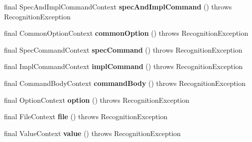\begin{DoxyCompactItemize}
\item 
\hypertarget{classedu_1_1udel_1_1cis_1_1vsl_1_1civl_1_1run_1_1common_1_1CommandParser_afbb20bc5e29cd4def9ef60e00644df9f}{}final Spec\+And\+Impl\+Command\+Context {\bfseries spec\+And\+Impl\+Command} ()  throws Recognition\+Exception \label{classedu_1_1udel_1_1cis_1_1vsl_1_1civl_1_1run_1_1common_1_1CommandParser_afbb20bc5e29cd4def9ef60e00644df9f}

\item 
\hypertarget{classedu_1_1udel_1_1cis_1_1vsl_1_1civl_1_1run_1_1common_1_1CommandParser_a45b151d7647ce098458e24858ea4d527}{}final Common\+Option\+Context {\bfseries common\+Option} ()  throws Recognition\+Exception \label{classedu_1_1udel_1_1cis_1_1vsl_1_1civl_1_1run_1_1common_1_1CommandParser_a45b151d7647ce098458e24858ea4d527}

\item 
\hypertarget{classedu_1_1udel_1_1cis_1_1vsl_1_1civl_1_1run_1_1common_1_1CommandParser_aa72f23edb71fb58248a8b8488e876258}{}final Spec\+Command\+Context {\bfseries spec\+Command} ()  throws Recognition\+Exception \label{classedu_1_1udel_1_1cis_1_1vsl_1_1civl_1_1run_1_1common_1_1CommandParser_aa72f23edb71fb58248a8b8488e876258}

\item 
\hypertarget{classedu_1_1udel_1_1cis_1_1vsl_1_1civl_1_1run_1_1common_1_1CommandParser_ac9efcc26c56a278c737f16b9a2f2233a}{}final Impl\+Command\+Context {\bfseries impl\+Command} ()  throws Recognition\+Exception \label{classedu_1_1udel_1_1cis_1_1vsl_1_1civl_1_1run_1_1common_1_1CommandParser_ac9efcc26c56a278c737f16b9a2f2233a}

\item 
\hypertarget{classedu_1_1udel_1_1cis_1_1vsl_1_1civl_1_1run_1_1common_1_1CommandParser_a22cebc9e35afa09b03e50c2395755ca7}{}final Command\+Body\+Context {\bfseries command\+Body} ()  throws Recognition\+Exception \label{classedu_1_1udel_1_1cis_1_1vsl_1_1civl_1_1run_1_1common_1_1CommandParser_a22cebc9e35afa09b03e50c2395755ca7}

\item 
\hypertarget{classedu_1_1udel_1_1cis_1_1vsl_1_1civl_1_1run_1_1common_1_1CommandParser_a2aa8faaa143d7ba25da59e84109fcc0b}{}final Option\+Context {\bfseries option} ()  throws Recognition\+Exception \label{classedu_1_1udel_1_1cis_1_1vsl_1_1civl_1_1run_1_1common_1_1CommandParser_a2aa8faaa143d7ba25da59e84109fcc0b}

\item 
\hypertarget{classedu_1_1udel_1_1cis_1_1vsl_1_1civl_1_1run_1_1common_1_1CommandParser_ab0a20bbf3c3fc93814fa322b03d731c6}{}final File\+Context {\bfseries file} ()  throws Recognition\+Exception \label{classedu_1_1udel_1_1cis_1_1vsl_1_1civl_1_1run_1_1common_1_1CommandParser_ab0a20bbf3c3fc93814fa322b03d731c6}

\item 
\hypertarget{classedu_1_1udel_1_1cis_1_1vsl_1_1civl_1_1run_1_1common_1_1CommandParser_a4d356a83b802044d4db52c0588686923}{}final Value\+Context {\bfseries value} ()  throws Recognition\+Exception \label{classedu_1_1udel_1_1cis_1_1vsl_1_1civl_1_1run_1_1common_1_1CommandParser_a4d356a83b802044d4db52c0588686923}

\end{DoxyCompactItemize}
